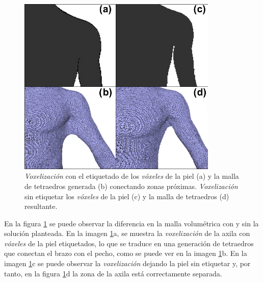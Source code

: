 \begin{figure}[ht]
  \centering
    \includegraphics[width=0.85\textwidth]{IMG/volumetrizacion4.png}
    \caption{
    \emph{Voxelización} con el etiquetado de los \emph{vóxeles} de la piel (a) y la malla de tetraedros generada (b) conectando zonas próximas. \emph{Voxelización} sin etiquetar los \emph{vóxeles} de la piel (c) y la malla de tetraedros (d) resultante.
    \label{fig:volsol}
    }

\end{figure}
%




En la figura \ref{fig:volsol} se puede observar la diferencia en la malla volumétrica con y sin la solución planteada. En la imagen \ref{fig:volsol}a, se muestra la  \emph{voxelización} de la axila con \emph{vóxeles} de la piel etiquetados, lo que se traduce en una generación de tetraedros que conectan el brazo con el pecho, como se puede ver en la imagen \ref{fig:volsol}b. En la imagen \ref{fig:volsol}c  se puede observar la \emph{voxelización} dejando la piel sin etiquetar y, por tanto, en la figura \ref{fig:volsol}d la zona de la axila está correctamente separada.
%

